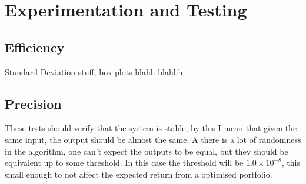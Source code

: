 \documentclass{pdfmx4020}
\begin{document}

  

  

  


\chapter{Experimentation and Testing}

  \section{Efficiency} %
  \label{sec:efficiency}
    Standard Deviation stuff, box plots blahh blahhh

  \section{Precision} %
  \label{sec:precision}
  These tests should verify that the system is stable, by this I mean that given the same input, the output should be almost the same. A there is a lot of randomness in the algorithm, one can't expect the outputs to be equal, but they should be equivalent up to some threshold. In this case the threshold will be $1.0\times10^{-8}$, this small enough to not affect the expected return from a optimised portfolio.
\end{document}
